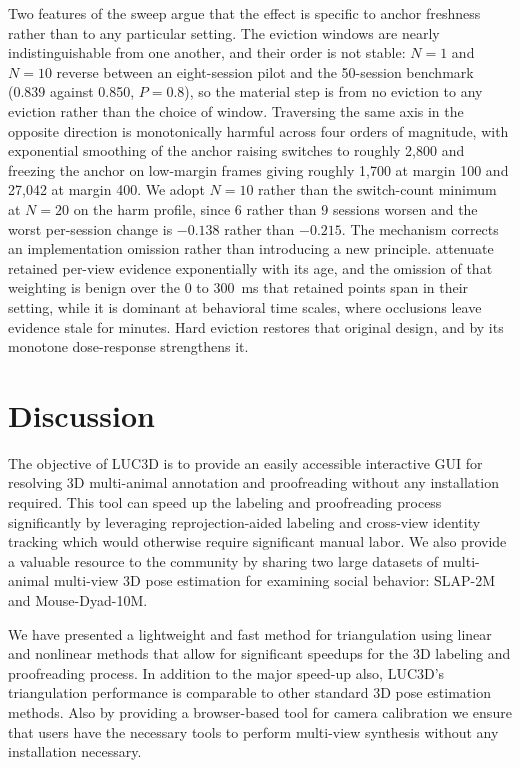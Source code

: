 \documentclass[pdflatex, sn-nature]{sn-jnl}
\theoremstyle{thmstyleone}%
\theoremstyle{thmstyletwo}%
\theoremstyle{thmstylethree}%
\begin{document}
Two features of the sweep argue that the effect is specific to anchor freshness rather than to any particular setting. The eviction windows are nearly indistinguishable from one another, and their order is not stable: $N = 1$ and $N = 10$ reverse between an eight-session pilot and the 50-session benchmark (0.839 against 0.850, $P = 0.8$), so the material step is from no eviction to any eviction rather than the choice of window. Traversing the same axis in the opposite direction is monotonically harmful across four orders of magnitude, with exponential smoothing of the anchor raising switches to roughly 2,800 and freezing the anchor on low-margin frames giving roughly 1,700 at margin 100 and 27,042 at margin 400. We adopt $N = 10$ rather than the switch-count minimum at $N = 20$ on the harm profile, since 6 rather than 9 sessions worsen and the worst per-session change is $-0.138$ rather than $-0.215$. The mechanism corrects an implementation omission rather than introducing a new principle. \citet{Chen2020} attenuate retained per-view evidence exponentially with its age, and the omission of that weighting is benign over the 0 to 300~ms that retained points span in their setting, while it is dominant at behavioral time scales, where occlusions leave evidence stale for minutes. Hard eviction restores that original design, and by its monotone dose-response strengthens it.

\FloatBarrier

\section{Discussion}\label{sec3}

The objective of LUC3D is to provide an easily accessible interactive GUI for resolving 3D multi-animal annotation and proofreading without any installation required. This tool can speed up the labeling and proofreading process significantly by leveraging reprojection-aided labeling and cross-view identity tracking which would otherwise require significant manual labor. We also provide a valuable resource to the community by sharing two large datasets of multi-animal multi-view 3D pose estimation for examining social behavior: SLAP-2M and Mouse-Dyad-10M. 

We have presented a lightweight and fast method for triangulation using linear and nonlinear methods that allow for significant speedups for the 3D labeling and proofreading process. In addition to the major speed-up also, LUC3D's triangulation performance is comparable to other standard 3D pose estimation methods. Also by providing a browser-based tool for camera calibration we ensure that users have the necessary tools to perform multi-view synthesis without any installation necessary. 
\end{document}
